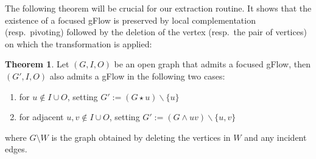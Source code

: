 \documentclass[a4paper,onecolumn,superscriptaddress,11pt,accepted=2020-04-27]{quantumarticle}
\newcommand{\bra}[1]{\ensuremath{\left\langle #1 \right|}}
\newcommand{\ket}[1]{\ensuremath{\left|  #1 \right\rangle}}
\newcommand{\ketbra}[2]{\ensuremath{\ket{#1}\!\bra{#2}}}
\theoremstyle{definition}
\newtheorem{theorem}{Theorem}[section]
\newcommand{\NOTEj}[1]{\marginpar{\footnotesize {\color{purple} \noindent\textbf{j:} #1}}}
\begin{document}
%
%
%
%




The following theorem will be crucial for our extraction routine. It shows that the existence of a focused gFlow is preserved by local complementation (resp.~pivoting) followed by the deletion of the vertex (resp.~the pair of vertices) on which the transformation is applied: 


\begin{theorem}\label{thm:gflow-preserve}
Let $(G,I,O)$ be an open graph that admits a focused gFlow, then $(G', I, O)$ also admits a gFlow in the following two cases: 
\begin{enumerate}
\item for $u \notin I \cup O$, setting $G' := (G \star u) \backslash \{ u \}$
\item for adjacent $u,v \notin I \cup O$, setting $G' := (G \wedge uv) \backslash \{ u, v \}$
\end{enumerate}
where $G\setminus W$ is the graph obtained by deleting the vertices in $W$ and any incident edges.
\end{theorem}
\end{document}

